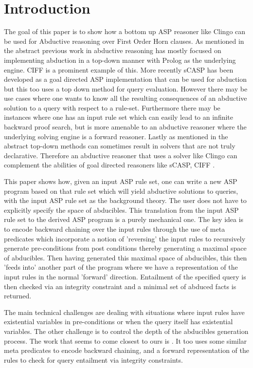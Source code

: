 \section{Introduction}\label{sec:introduction}

The goal of this paper is to show how a bottom up ASP reasoner like Clingo can be used for Abductive reasoning over First Order Horn clauses. As mentioned in the abstract previous work in abductive reasoning has mostly focused on implementing abduction in a top-down manner with Prolog as the underlying engine. CIFF \cite{mancarella09:_ciff} is a prominent example of this. More recently sCASP \cite{arias19:_const_answer_set_progr_groun_applic,arias_phd_2019} has been developed as a goal directed ASP implementation that can be used for abduction but this too uses a top down method for query evaluation. However there may be use cases where one wants to know all the resulting consequences of an abductive solution to a query with respect to a rule-set. Furthermore there may be instances where one has an input rule set which can easily lead to an infinite backward proof search, but is more amenable to an abductive reasoner where the underlying solving engine is a forward reasoner. Lastly as mentioned in the abstract top-down methods can sometimes result in solvers that are not truly declarative. Therefore an abductive reasoner that uses a solver like Clingo \cite{gebser12:_answer_set_solvin_pract} can
complement the abilities of goal directed reasoners like sCASP, CIFF \etc.

This paper shows how, given an input ASP rule set, one can write a new ASP program based on that rule set which will yield abductive solutions to queries, with the input ASP rule set as the background theory. The user does not have to explicitly specify the space of abducibles. This translation from the input ASP rule set to the derived ASP program is a purely mechanical one. The key idea is to encode backward chaining over the input rules through the use of meta predicates which incorporate a notion of 'reversing' the input rules to recursively generate pre-conditions from post conditions thereby generating a maximal space of abducibles. Then having generated this maximal space of abducibles, this then 'feeds into' another part of the program where we have a representation of the input rules in the normal 'forward' direction. Entailment of the specified query is then checked via an integrity constraint and a minimal set of abduced facts is returned.

The main technical challenges are dealing with situations where input rules have existential variables in pre-conditions or when the query itself has existential variables. The other challenge is to control the depth of the abducibles generation process. The work that seems to come closest to ours is \cite{schueller16:_model_variat_first_order_horn}. It too uses some similar meta predicates to encode backward chaining, and a forward representation of the rules to check for query entailment via integrity constraints.

